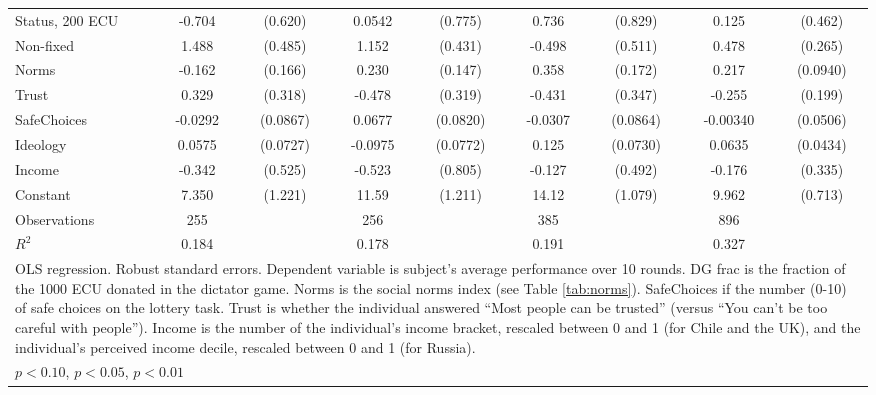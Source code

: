 {\begin{tabular}{l*{4}{cc}}
Status, 200 ECU &   -0.704         &  (0.620)&   0.0542         &  (0.775)&    0.736         &  (0.829)&    0.125         &  (0.462)\\
Non-fixed       &    1.488\sym{***}&  (0.485)&    1.152\sym{***}&  (0.431)&   -0.498         &  (0.511)&    0.478\sym{*}  &  (0.265)\\
Norms           &   -0.162         &  (0.166)&    0.230         &  (0.147)&    0.358\sym{**} &  (0.172)&    0.217\sym{**} & (0.0940)\\
Trust           &    0.329         &  (0.318)&   -0.478         &  (0.319)&   -0.431         &  (0.347)&   -0.255         &  (0.199)\\
SafeChoices     &  -0.0292         & (0.0867)&   0.0677         & (0.0820)&  -0.0307         & (0.0864)& -0.00340         & (0.0506)\\
Ideology        &   0.0575         & (0.0727)&  -0.0975         & (0.0772)&    0.125\sym{*}  & (0.0730)&   0.0635         & (0.0434)\\
Income          &   -0.342         &  (0.525)&   -0.523         &  (0.805)&   -0.127         &  (0.492)&   -0.176         &  (0.335)\\
Constant        &    7.350\sym{***}&  (1.221)&    11.59\sym{***}&  (1.211)&    14.12\sym{***}&  (1.079)&    9.962\sym{***}&  (0.713)\\
\hline
Observations    &      255         &         &      256         &         &      385         &         &      896         &         \\
\(R^{2}\)       &    0.184         &         &    0.178         &         &    0.191         &         &    0.327         &         \\
\hline\hline
\multicolumn{9}{p{17cm}}{\tiny OLS regression. Robust standard errors. Dependent variable is subject's average performance over 10 rounds. DG frac is the fraction of the 1000 ECU donated in the dictator game. Norms is the social norms index (see Table \ref{tab:norms}). SafeChoices if the number (0-10) of safe choices on the lottery task. Trust is whether the individual answered ``Most people can be trusted'' (versus ``You can't be too careful with people''). Income is the number of the individual's income bracket, rescaled between 0 and 1 (for Chile and the UK), and the individual's perceived income decile, rescaled between 0 and 1 (for Russia).}\\
\multicolumn{9}{l}{\footnotesize \sym{*} \(p<0.10\), \sym{**} \(p<0.05\), \sym{***} \(p<0.01\)}\\
\end{tabular}
}
